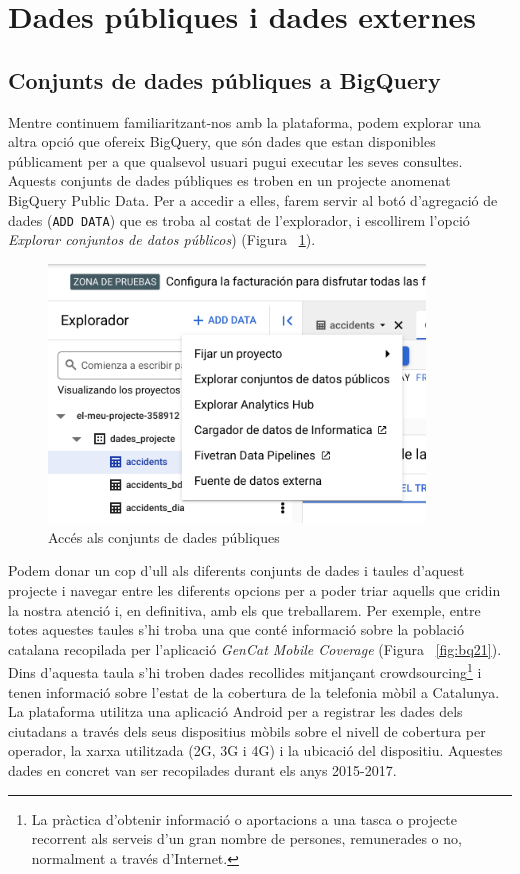 \documentclass[12pt,longbibliography]{article}
\theoremstyle{definition}
\theoremstyle{remark}
\begin{document}
\newpage

\section{Dades públiques i dades externes}

\subsection{Conjunts de dades públiques a BigQuery}

Mentre continuem familiaritzant-nos amb la plataforma, podem explorar una altra opció que ofereix BigQuery, que són dades que estan disponibles públicament per a que qualsevol usuari pugui executar les seves consultes. Aquests conjunts de dades públiques es troben en un projecte anomenat BigQuery Public Data. Per a accedir a elles, farem servir al botó d'agregació de dades (\verb|ADD DATA|) que es troba al costat de l'explorador, i escollirem l'opció \textit{Explorar conjuntos de datos públicos}) (Figura ~\ref{fig:bq20}).


\begin{figure}[h!]
\begin{center}
\includegraphics[width=10cm]{bq20}
\end{center}
\caption{Accés als conjunts de dades públiques}
\label{fig:bq20}
\end{figure}


Podem donar un cop d'ull als diferents conjunts de dades i taules d'aquest projecte i navegar entre les diferents opcions per a poder triar aquells que cridin la nostra atenció i, en definitiva, amb els que treballarem. Per exemple, entre totes aquestes taules s'hi troba una que conté informació sobre la població catalana recopilada per l'aplicació \textit{GenCat Mobile Coverage} (Figura ~\ref{fig:bq21}). Dins d'aquesta taula s'hi troben dades recollides mitjançant crowdsourcing\footnote[1]{La pràctica d'obtenir informació o aportacions a una tasca o projecte recorrent als serveis d'un gran nombre de persones, remunerades o no, normalment a través d'Internet.} i tenen informació sobre l'estat de la cobertura de la telefonia mòbil a Catalunya. La plataforma utilitza una aplicació Android per a registrar les dades dels ciutadans a través dels seus dispositius mòbils sobre el nivell de cobertura per operador, la xarxa utilitzada (2G, 3G i 4G) i la ubicació del dispositiu. Aquestes dades en concret van ser recopilades durant els anys 2015-2017.
\end{document}
